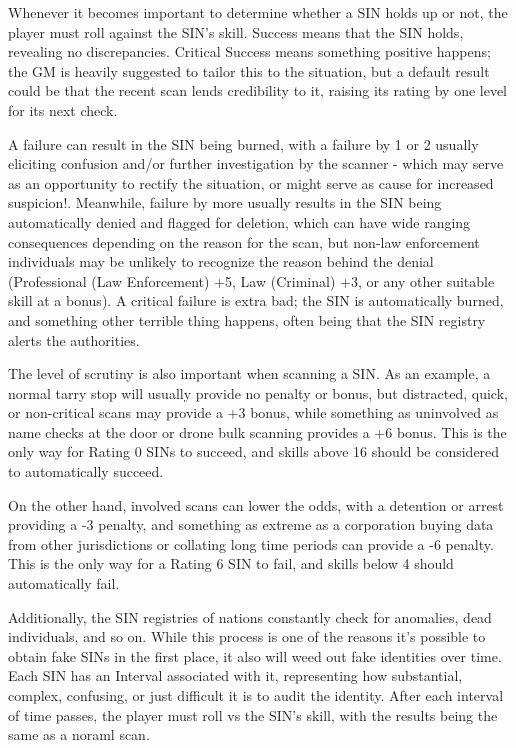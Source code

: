 Whenever it becomes important to determine whether a SIN holds up or not, the player must roll against the SIN's skill. Success means that the SIN holds, revealing no discrepancies. Critical Success means something positive happens; the GM is heavily suggested to tailor this to the situation, but a default result could be that the recent scan lends credibility to it, raising its rating by one level for its next check. 

A failure can result in the SIN being burned, with a failure by 1 or 2 usually eliciting confusion and/or further investigation by the scanner - which may serve as an opportunity to rectify the situation, or might serve as cause for increased suspicion!. Meanwhile, failure by more usually results in the SIN being automatically denied and flagged for deletion, which can have wide ranging consequences depending on the reason for the scan, but non-law enforcement individuals may be unlikely to recognize the reason behind the denial (Professional (Law Enforcement) +5, Law (Criminal) +3, or any other suitable skill at a bonus). A critical failure is extra bad; the SIN is automatically burned, and something other terrible thing happens, often being that the SIN registry alerts the authorities.

The level of scrutiny is also important when scanning a SIN. As an example, a normal tarry stop will usually provide no penalty or bonus, but distracted, quick, or non-critical scans may provide a +3 bonus, while something as uninvolved as name checks at the door or drone bulk scanning provides a +6 bonus. This is the only way for Rating 0 SINs to succeed, and skills above 16 should be considered to automatically succeed. 

On the other hand, involved scans can lower the odds, with a detention or arrest providing a -3 penalty, and something as extreme as a corporation buying data from other jurisdictions or collating long time periods can provide a -6 penalty. This is the only way for a Rating 6 SIN to fail, and skills below 4 should automatically fail.

Additionally, the SIN registries of nations constantly check for anomalies, dead individuals, and so on. While this process is one of the reasons it's possible to obtain fake SINs in the first place, it also will weed out fake identities over time. Each SIN has an Interval associated with it, representing how substantial, complex, confusing, or just difficult it is to audit the identity. After each interval of time passes, the player must roll vs the SIN's skill, with the results being the same as a noraml scan.

